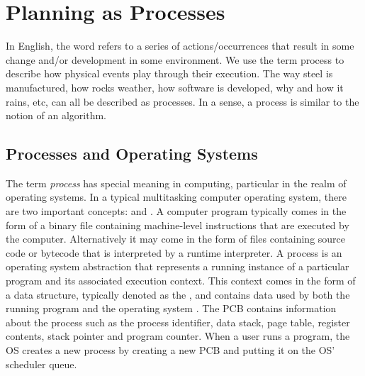 \section{Planning as Processes}
In English, the word  refers to a series of actions/occurrences that result in some change and/or development in some environment. We use the term process to describe how physical events play through their execution. The way steel is manufactured, how rocks weather, how software is developed, why and how it rains, etc, can all be described as processes. In a sense, a process is similar to the notion of an algorithm. 

\subsection{Processes and Operating Systems}
The term \textit{process} has special meaning in computing, particular in the realm of operating systems. In a typical multitasking computer operating system, there are two important concepts:  and . A computer program typically comes in the form of a binary file containing machine-level instructions that are executed by the computer. Alternatively it may come in the form of files containing source code or bytecode that is interpreted by a runtime interpreter. A process is an operating system abstraction that represents a running instance of a particular program and its associated execution context. This context comes in the form of a data structure, typically denoted as the , and contains data used by both the running program and the operating system \citep{silberschatz:osconcepts}. The PCB contains information about the process such as the process identifier, data stack, page table, register contents, stack pointer and program counter. When a user runs a program, the OS creates a new process by creating a new PCB and putting it on the OS' scheduler queue.

